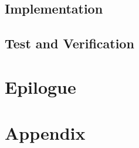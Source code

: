 

\chapter{Implementation}

\chapter{Test and Verification}




\part{Epilogue}


\part{Appendix} %
